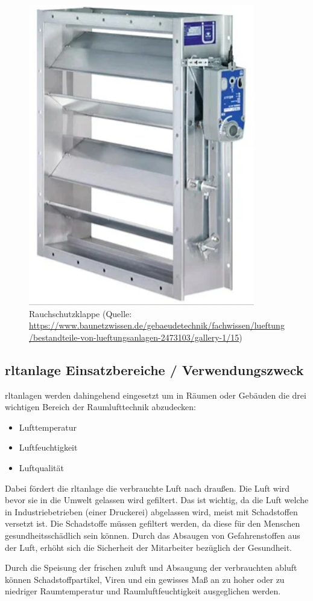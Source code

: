 \begin{figure}[H]
	\centering
	\includegraphics[width=0.3\linewidth]{Bilder/rauchschutzklappe}
	\caption[Rauchschutzklappe (Quelle: 
	\url{https://www.baunetzwissen.de/gebaeudetechnik/fachwissen/lueftung/bestandteile-von-lueftungsanlagen-2473103/gallery-1/15}, Zufgriff 13.02.2024)]{Rauchschutzklappe (Quelle: 
	\url{https://www.baunetzwissen.de/gebaeudetechnik/fachwissen/lueftung/bestandteile-von-lueftungsanlagen-2473103/gallery-1/15})} 
	\label{fig:Rauchschutzklappe}
\end{figure}


\newpage
\subsection{\ac{rltanlage} Einsatzbereiche / Verwendungszweck}

\ac{rltanlage}n werden dahingehend eingesetzt um in Räumen oder Gebäuden die drei wichtigen Bereich der Raumlufttechnik abzudecken:

\begin{itemize}
	\item Lufttemperatur
	\item Luftfeuchtigkeit
	\item Luftqualität
\end{itemize} 

Dabei fördert die \ac{rltanlage} die verbrauchte Luft nach draußen. Die Luft wird bevor sie in die Umwelt gelassen wird gefiltert. Das ist wichtig, da die Luft welche in Industriebetrieben (\zB einer Druckerei) abgelassen wird, meist mit Schadstoffen versetzt ist. Die Schadstoffe müssen gefiltert werden, da diese für den Menschen gesundheitsschädlich sein können. Durch das Absaugen von Gefahrenstoffen aus der Luft, erhöht sich die Sicherheit der Mitarbeiter bezüglich der Gesundheit.

Durch die Speisung der frischen \gls{zuluft} und Absaugung der verbrauchten \gls{abluft} können Schadstoffpartikel, Viren und ein gewisses Maß an zu hoher oder zu niedriger Raumtemperatur und Raumluftfeuchtigkeit ausgeglichen werden. 
\cite[vgl.][]{DGWZ:o.J.}

